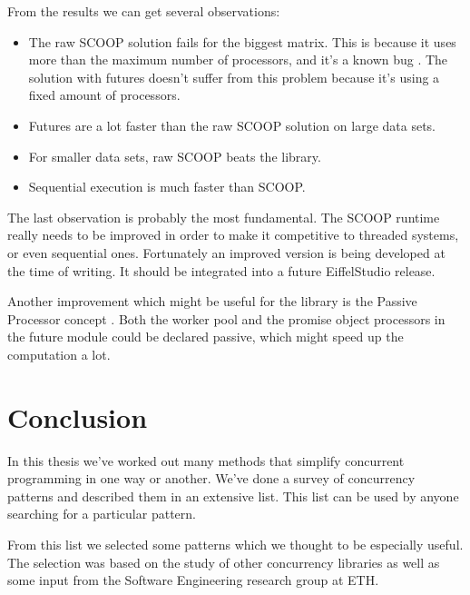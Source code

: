 \documentclass[a4paper,10pt]{article}
\begin{document}

From the results we can get several observations:

\begin{itemize}
 \item The raw SCOOP solution fails for the biggest matrix. 
 This is because it uses more than the maximum number of processors, and it's a known bug \cite{web:scoop-issues}.
 The solution with futures doesn't suffer from this problem because it's using a fixed amount of processors.
 \item Futures are a lot faster than the raw SCOOP solution on large data sets.
 \item For smaller data sets, raw SCOOP beats the library.
 \item Sequential execution is much faster than SCOOP.
\end{itemize}

The last observation is probably the most fundamental.
The SCOOP runtime really needs to be improved in order to make it competitive to threaded systems, or even sequential ones.
Fortunately an improved version \cite{thesis:scottwest} is being developed at the time of writing.
It should be integrated into a future EiffelStudio release.

Another improvement which might be useful for the library is the Passive Processor concept \cite{paper:passive-processors}.
Both the worker pool and the promise object processors in the future module could be declared passive, which might speed up the computation a lot.

\section{Conclusion}

In this thesis we've worked out many methods that simplify concurrent programming in one way or another.
We've done a survey of concurrency patterns and described them in an extensive list.
This list can be used by anyone searching for a particular pattern.

From this list we selected some patterns which we thought to be especially useful.
The selection was based on the study of other concurrency libraries as well as some input from the Software Engineering research group at ETH.
\end{document}
